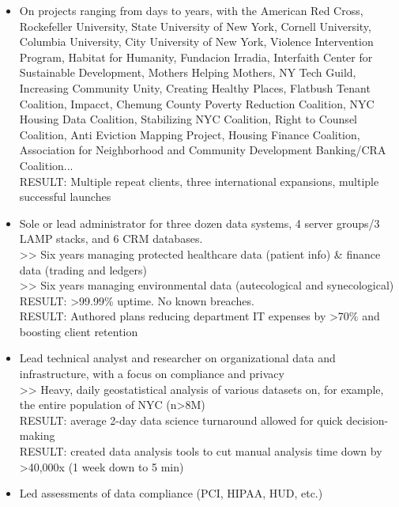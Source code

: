 \documentclass[]{deedy-resume-openfont}
\begin{document}
    \begin{itemize}
        \item On projects ranging from days to years, with the American Red Cross, Rockefeller University, State University of New York, Cornell University, Columbia University, City University of New York, Violence Intervention Program, Habitat for Humanity, Fundacion Irradia, Interfaith Center for Sustainable Development, Mothers Helping Mothers, NY Tech Guild, Increasing Community Unity, Creating Healthy Places, Flatbush Tenant Coalition, Impacct, Chemung County Poverty Reduction Coalition, NYC Housing Data Coalition, Stabilizing NYC Coalition, Right to Counsel Coalition, Anti Eviction Mapping Project, Housing Finance Coalition, Association for Neighborhood and Community Development Banking/CRA Coalition...
        \\RESULT: Multiple repeat clients, three international expansions, multiple successful launches
        \item Sole or lead administrator for three dozen data systems, 4 server groups/3 LAMP stacks, and 6 CRM databases.
        \\>> Six years managing protected healthcare data (patient info) \& finance data (trading and ledgers)
        \\>> Six years managing environmental data (autecological and synecological) 
        \\ RESULT: >99.99\% uptime. No known breaches.
        \\ RESULT: Authored plans reducing department IT expenses by >70\% and boosting client retention
        \item Lead technical analyst and researcher on organizational data and infrastructure, with a focus on compliance and privacy
        \\ >> Heavy, daily geostatistical analysis of various datasets on, for example, the entire population of NYC (n>8M)
        \\ RESULT: average 2-day data science turnaround allowed for quick decision-making
        \\ RESULT: created data analysis tools to cut manual analysis time down by >40,000x (1 week down to 5 min)
        \item Led assessments of data compliance (PCI, HIPAA, HUD, etc.)

\end{itemize}
\end{document}
